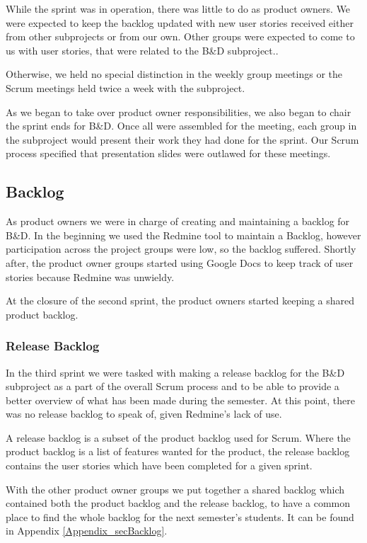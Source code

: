 While the sprint was in operation, there was little to do as product owners. We were expected to keep the backlog updated with new user stories received either from other subprojects or from our own. Other groups were expected to come to us with user stories, that were related to the B&D subproject..

Otherwise, we held no special distinction in the weekly group meetings or the Scrum meetings held twice a week with the subproject.

As we began to take over product owner responsibilities, we also began to chair the sprint ends for B\&D. Once all were assembled for the meeting, each group in the subproject would present their work they had done for the sprint. Our Scrum process specified that presentation slides were outlawed for these meetings.

\subsection{Backlog} \label{Roles_SecReleaseBacklog}
As product owners we were in charge of creating and maintaining a backlog for B\&D. In the beginning we used the Redmine tool to maintain a Backlog, however participation across the project groups were low, so the backlog suffered. Shortly after, the product owner groups started using Google Docs to keep track of user stories because Redmine was unwieldy.

At the closure of the second sprint, the product owners started keeping a shared product backlog.

\subsubsection{Release Backlog}
In the third sprint we were tasked with making a release backlog for the B\&D subproject as a part of the overall Scrum process and to be able to provide a better overview of what has been made during the semester. At this point, there was no release backlog to speak of, given Redmine's lack of use.

A release backlog is a subset of the product backlog used for Scrum. Where the product backlog is a list of features wanted for the product, the release backlog contains the user stories which have been completed for a given sprint.

With the other product owner groups we put together a shared backlog which contained both the product backlog and the release backlog, to have a common place to find the whole backlog for the next semester’s students. It can be found in Appendix \ref{Appendix_secBacklog}.

